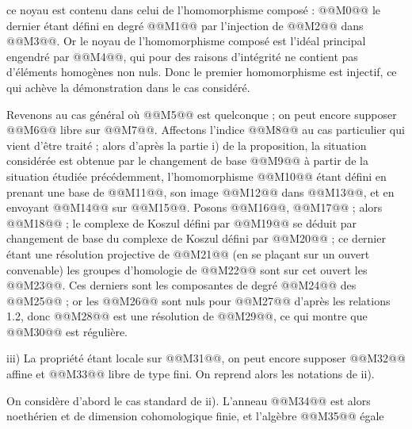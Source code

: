 
ce noyau est contenu dans celui de l'homomorphisme composé :
@@M0@@
le dernier étant défini en degré @@M1@@ par l'injection de @@M2@@ dans @@M3@@. Or le noyau de l'homomorphisme composé est l'idéal principal engendré par @@M4@@, qui pour des raisons d'intégrité ne contient pas d'éléments homogènes non nuls. Donc le premier homomorphisme est injectif, ce qui achève la démonstration dans le cas considéré.

Revenons au cas général où @@M5@@ est quelconque ; on peut encore supposer @@M6@@ libre sur @@M7@@. Affectons l'indice @@M8@@ au cas particulier qui vient d'être traité ; alors d'après la partie i) de la proposition, la situation considérée est obtenue par le changement de base @@M9@@ à partir de la situation étudiée précédemment, l'homomorphisme @@M10@@ étant défini en prenant une base de @@M11@@, son image @@M12@@ dans @@M13@@, et en envoyant @@M14@@ sur @@M15@@. Posons @@M16@@, @@M17@@ ; alors @@M18@@ ; le complexe de Koszul défini par @@M19@@ se déduit par changement de base du complexe de Koszul défini par @@M20@@ ; ce dernier étant une résolution projective de @@M21@@ (en se plaçant sur un ouvert convenable) les groupes d'homologie de @@M22@@ sont sur cet ouvert les @@M23@@. Ces derniers sont les composantes de degré @@M24@@ des @@M25@@ ; or les @@M26@@ sont nuls pour @@M27@@ d'après les relations 1.2, donc @@M28@@ est une résolution de @@M29@@, ce qui montre que @@M30@@ est régulière.

iii) La propriété étant locale sur @@M31@@, on peut encore supposer @@M32@@ affine et @@M33@@ libre de type fini. On reprend alors les notations de ii).

On considère d'abord le cas standard de ii). L'anneau @@M34@@ est alors noethérien et de dimension cohomologique finie, et l'algèbre @@M35@@
égale%

